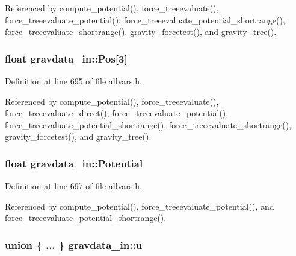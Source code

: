 Referenced by compute\_\-potential(), force\_\-treeevaluate(), force\_\-treeevaluate\_\-potential(), force\_\-treeevaluate\_\-potential\_\-shortrange(), force\_\-treeevaluate\_\-shortrange(), gravity\_\-forcetest(), and gravity\_\-tree().

\hypertarget{structgravdata__in_a8cac0f094027f8638152ecdcf11f1e92}{
\subsubsection[{Pos}]{\setlength{\rightskip}{0pt plus 5cm}float {\bf gravdata\_\-in::Pos}\mbox{[}3\mbox{]}}}
\label{structgravdata__in_a8cac0f094027f8638152ecdcf11f1e92}


Definition at line 695 of file allvars.h.



Referenced by compute\_\-potential(), force\_\-treeevaluate(), force\_\-treeevaluate\_\-direct(), force\_\-treeevaluate\_\-potential(), force\_\-treeevaluate\_\-potential\_\-shortrange(), force\_\-treeevaluate\_\-shortrange(), gravity\_\-forcetest(), and gravity\_\-tree().

\hypertarget{structgravdata__in_ac003758a6c6e72bb9cc1ce619fabf148}{
\subsubsection[{Potential}]{\setlength{\rightskip}{0pt plus 5cm}float {\bf gravdata\_\-in::Potential}}}
\label{structgravdata__in_ac003758a6c6e72bb9cc1ce619fabf148}


Definition at line 697 of file allvars.h.



Referenced by compute\_\-potential(), force\_\-treeevaluate\_\-potential(), and force\_\-treeevaluate\_\-potential\_\-shortrange().

\hypertarget{structgravdata__in_a89df6fdf4fb1512fa2b491eb4fb10662}{
\subsubsection[{u}]{\setlength{\rightskip}{0pt plus 5cm}union \{ ... \} 
   {\bf gravdata\_\-in::u}}}
\label{structgravdata__in_a89df6fdf4fb1512fa2b491eb4fb10662}


